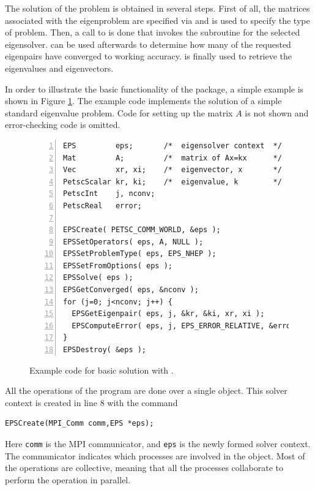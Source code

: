 	The solution of the problem is obtained in several steps. First of all, the matrices associated with the eigenproblem are specified via  and  is used to specify the type of problem. Then, a call to  is done that invokes the subroutine for the selected eigensolver.  can be used afterwards to determine how many of the requested eigenpairs have converged to working accuracy.  is finally used to retrieve the eigenvalues and eigenvectors.

	In order to illustrate the basic functionality of the  package, a simple example is shown in Figure \ref{fig:ex-eps}. The example code implements the solution of a simple standard eigenvalue problem. Code for setting up the matrix $A$ is not shown and error-checking code is omitted.

\begin{figure}
\begin{Verbatim}[fontsize=\small,numbers=left,numbersep=6pt,xleftmargin=15mm]
EPS         eps;       /*  eigensolver context  */
Mat         A;         /*  matrix of Ax=kx      */
Vec         xr, xi;    /*  eigenvector, x       */
PetscScalar kr, ki;    /*  eigenvalue, k        */
PetscInt    j, nconv;
PetscReal   error;

EPSCreate( PETSC_COMM_WORLD, &eps );
EPSSetOperators( eps, A, NULL );
EPSSetProblemType( eps, EPS_NHEP );
EPSSetFromOptions( eps );
EPSSolve( eps );
EPSGetConverged( eps, &nconv );
for (j=0; j<nconv; j++) {
  EPSGetEigenpair( eps, j, &kr, &ki, xr, xi );
  EPSComputeError( eps, j, EPS_ERROR_RELATIVE, &error );
}
EPSDestroy( &eps );
\end{Verbatim}
\caption{\label{fig:ex-eps}Example code for basic solution with .}
\end{figure}

	All the operations of the program are done over a single  object. This solver context is created in line 8 with the command
	\begin{Verbatim}[fontsize=\small]
	EPSCreate(MPI_Comm comm,EPS *eps);
	\end{Verbatim}
	Here \texttt{comm} is the MPI communicator, and \texttt{eps} is the newly formed solver context. The communicator indicates which processes are involved in the  object. Most of the  operations are collective, meaning that all the processes collaborate to perform the operation in parallel.

